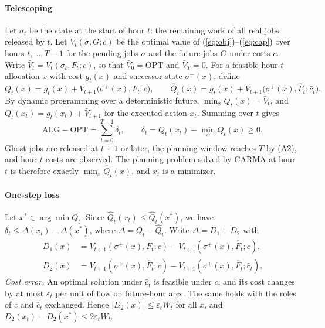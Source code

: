 \paragraph{Telescoping} Let $\sigma_t$ be the state at the start of hour $t$: the remaining work of all real jobs released by $t$. Let $V_t(\sigma,G;c)$ be the optimal value of (\ref{eq:obj})--(\ref{eq:cap}) over hours $t,\dots,T-1$ for the pending jobs $\sigma$ and the future jobs $G$ under costs $c$. Write $\bar V_t=V_t(\sigma_t,F_t;c)$, so that $\bar V_0=\mathrm{OPT}$ and $\bar V_T=0$. For a feasible hour-$t$ allocation $x$ with cost $g_t(x)$ and successor state $\sigma^+(x)$, define
\[
Q_t(x)=g_t(x)+V_{t+1}\big(\sigma^+(x),F_t;c\big),\qquad \hat Q_t(x)=g_t(x)+V_{t+1}\big(\sigma^+(x),\hat F_t;\hat c_t\big).
\]
By dynamic programming over a deterministic future, $\min_xQ_t(x)=\bar V_t$, and $Q_t(x_t)=g_t(x_t)+\bar V_{t+1}$ for the executed action $x_t$. Summing over $t$ gives
\[
\mathrm{ALG}-\mathrm{OPT}=\sum_{t=0}^{T-1}\delta_t,\qquad \delta_t=Q_t(x_t)-\min_xQ_t(x)\ge 0.
\]
Ghost jobs are released at $t+1$ or later, the planning window reaches $T$ by (A2), and hour-$t$ costs are observed. The planning problem solved by CARMA at hour $t$ is therefore exactly $\min_x\hat Q_t(x)$, and $x_t$ is a minimizer.

\paragraph{One-step loss} Let $x^*\in\arg\min Q_t$. Since $\hat Q_t(x_t)\le\hat Q_t(x^*)$, we have $\delta_t\le\Delta(x_t)-\Delta(x^*)$, where $\Delta=Q_t-\hat Q_t$. Write $\Delta=D_1+D_2$ with
\begin{align*}
D_1(x)&=V_{t+1}(\sigma^+(x),F_t;c)-V_{t+1}(\sigma^+(x),\hat F_t;c),\\
D_2(x)&=V_{t+1}(\sigma^+(x),\hat F_t;c)-V_{t+1}(\sigma^+(x),\hat F_t;\hat c_t).
\end{align*}
\emph{Cost error.} An optimal solution under $\hat c_t$ is feasible under $c$, and its cost changes by at most $\varepsilon_t$ per unit of flow on future-hour arcs. The same holds with the roles of $c$ and $\hat c_t$ exchanged. Hence $|D_2(x)|\le\varepsilon_tW_t$ for all $x$, and $D_2(x_t)-D_2(x^*)\le 2\varepsilon_tW_t$.

